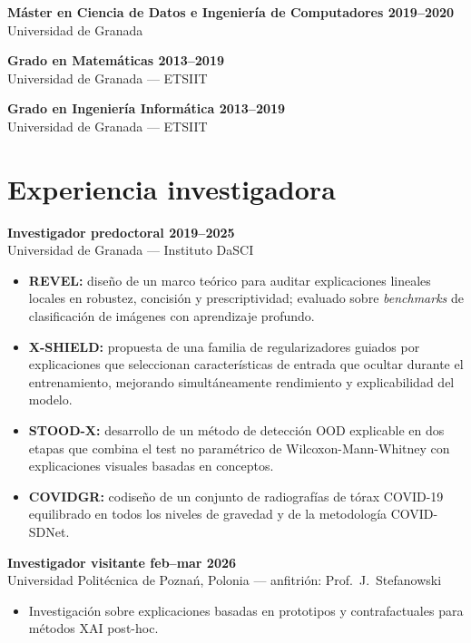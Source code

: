 \documentclass[10pt,a4paper]{article}
\newcommand{\blueitem}[1]{\textcolor{subtitleblue}{\textbf{#1}}}
\newcommand{\sub}[1]{\textcolor{subtle}{\footnotesize #1}}
\begin{document}
\vspace{0.2em}

\blueitem{Máster en Ciencia de Datos e Ingeniería de Computadores \hfill 2019--2020} \\
\sub{Universidad de Granada}

\vspace{0.2em}

\blueitem{Grado en Matemáticas \hfill 2013--2019} \\
\sub{Universidad de Granada --- ETSIIT}

\vspace{0.2em}

\blueitem{Grado en Ingeniería Informática \hfill 2013--2019} \\
\sub{Universidad de Granada --- ETSIIT}

\section*{Experiencia investigadora}

\blueitem{Investigador predoctoral \hfill 2019--2025} \\
\sub{Universidad de Granada --- Instituto DaSCI}
\begin{itemize}
    \item \textbf{REVEL:} diseño de un marco teórico para auditar explicaciones lineales locales en robustez, concisión y prescriptividad; evaluado sobre \textit{benchmarks} de clasificación de imágenes con aprendizaje profundo.
    \item \textbf{X-SHIELD:} propuesta de una familia de regularizadores guiados por explicaciones que seleccionan características de entrada que ocultar durante el entrenamiento, mejorando simultáneamente rendimiento y explicabilidad del modelo.
    \item \textbf{STOOD-X:} desarrollo de un método de detección OOD explicable en dos etapas que combina el test no paramétrico de Wilcoxon-Mann-Whitney con explicaciones visuales basadas en conceptos.
    \item \textbf{COVIDGR:} codiseño de un conjunto de radiografías de tórax COVID-19 equilibrado en todos los niveles de gravedad y de la metodología COVID-SDNet.
\end{itemize}

\blueitem{Investigador visitante \hfill feb--mar 2026} \\
\sub{Universidad Politécnica de Poznań, Polonia --- anfitrión: Prof.~J.~Stefanowski}
\begin{itemize}
    \item Investigación sobre explicaciones basadas en prototipos y contrafactuales para métodos XAI post-hoc.
\end{itemize}
\end{document}
